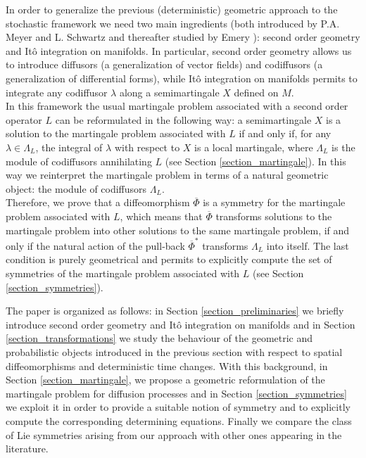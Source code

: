 \documentclass{article}[10pt]
\begin{document}
In order to generalize the previous (deterministic) geometric approach to the stochastic framework we need two main ingredients (both introduced by
P.A. Meyer and L. Schwartz
\cite{Meyer1981,Schwartz1982} and thereafter studied by Emery \cite{Emery1989}): second order geometry and It\^o integration on manifolds.
In particular, second order geometry allows us
to introduce diffusors (a generalization of vector fields) and  codiffusors (a generalization of differential forms), while
It\^o integration on  manifolds permits to integrate any codiffusor $\lambda$ along a semimartingale $X$ defined on $M$.\\
In this framework  the usual martingale problem associated with a second order operator $L$ can be reformulated in the following way: a
semimartingale $X$ is a solution to the martingale problem associated with $L$ if and only if, for any $\lambda \in \Lambda_L$, the integral of
$\lambda$ with respect to $X$ is a local martingale, where $\Lambda_L$ is the module of codiffusors annihilating $L$ (see Section
\ref{section_martingale}). In this way we reinterpret the  martingale
problem in terms of a natural geometric object: the module of codiffusors $\Lambda_L$.\\
Therefore,  we prove that a diffeomorphism $\overline{\Phi}$ is a symmetry for the martingale problem associated with $L$, which means
that $\overline{\Phi}$ transforms solutions to the martingale problem into other solutions to the same martingale problem, if and only if the natural
action of the pull-back $\overline{\Phi}^*$ transforms $\Lambda_L$ into itself. The last condition is purely geometrical and  permits to explicitly
compute
the set of symmetries of the martingale problem associated with $L$ (see Section \ref{section_symmetries}).


The paper is organized as follows: in Section \ref{section_preliminaries} we briefly introduce  second order geometry and It\^o integration on
manifolds and in Section \ref{section_transformations} we study the behaviour of the geometric and probabilistic objects introduced in the
previous section with respect to spatial diffeomorphisms and deterministic time changes. With this background, in Section \ref{section_martingale}, we
propose a geometric reformulation of the martingale problem for diffusion processes and in Section \ref{section_symmetries} we exploit it  in order to provide a suitable notion of symmetry and to explicitly compute  the corresponding  determining equations. Finally we
compare the class of Lie symmetries  arising from our approach  with other ones appearing in the literature.
\end{document}

